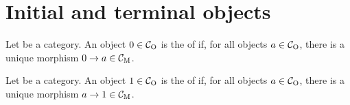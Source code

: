 \section{Initial and terminal objects}
\label{sec:constructions-initial-terminal-objects}


\begin{definition}

  \label{def:initial-object}


  Let  be a category. An object $0 \in \mathcal{C}_{\operatorname{O}}$ is the
   of  if, for all objects $a \in
  \mathcal{C}_{\operatorname{O}}$, there is a unique morphism $0 \to a \in \mathcal{C}_{\operatorname{M}}$.

\end{definition}

\begin{definition}

  \label{def:terminal-object}


  Let  be a category. An object $1 \in \mathcal{C}_{\operatorname{O}}$ is the
   of  if, for all
  objects $a \in \mathcal{C}_{\operatorname{O}}$, there is a unique morphism $a \to 1 \in
  \mathcal{C}_{\operatorname{M}}$.

\end{definition}

